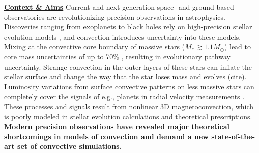 \documentclass[12pt]{article}
\newcommand{\sct}[1]{\vspace{0.3cm}\hspace{-\parindent}\textbf{\underline{#1}}\hspace{0.3cm}}
\begin{document}
\thispagestyle{fancy}

\sct{Context \& Aims}
Current and next-generation space- and ground-based observatories are revolutionizing precision observations in astrophysics.
%
%
Discoveries ranging from exoplanets to black holes rely on high-precision stellar evolution models \citep{mesa6}, and convection introduces uncertainty into these models.
Mixing at the convective core boundary of massive stars ($M_* \gtrsim 1.1 M_\odot$) lead to core mass uncertainties of up to 70\% \citep{kaiser_etal_2020}, resulting in evolutionary pathway uncertainty.
Strange convection in the outer layers of these stars can inflate the stellar surface and change the way that the star loses mass and evolves (cite).
Luminosity variations from surface convective patterns on less massive stars can completely cover the signals of e.g., planets in radial velocity measurements \citep{crass_etal_2021}.
These processes and signals result from nonlinear 3D magnetoconvection, which is poorly modeled in stellar evolution calculations and theoretical prescriptions.
\textbf{Modern precision observations have revealed major theoretical shortcomings in models of convection and demand a new state-of-the-art set of convective simulations. }
\end{document}
